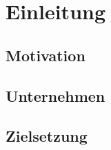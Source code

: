 \section{Einleitung}
\subsection{Motivation}
\subsection{Unternehmen}
\subsection{Zielsetzung}
\newpage

\begin{comment}
- Outline your work such that readers who have not read subsequent chapters get an idea of what
  - your "problem domain" is (e.g. the software quality department of some company or the overarching research project you are working in)
  - the situation is (e.g. software tests at some company are done in complete manual fash-ion)
  - the complication / problem is (e.g. hotfixes have to be deployed totally untested in pro-duction)
  - what your approach is (e.g. establishing a concept and tool evaluation for continuously improving code coverage of automated tests)
  - what beyond the scope of your thesis is (e.g. also implementing a CICD pipeline)
  - what the actual core results are (e.g. how many tools have been evaluated)

From that it must clear, what your thesis'contribution actually is. Please delineate your contribution from every concept, method, tool, framework or whatever implementation your thesis took for granted and is built upon.

This chapter deliberately anticipates contents of the latter chapters but please refrain from spe-cific technical termsof your application domain or solution here. Trade technical accuracy for com-mon comprehensibility here. Write this chapter as a "management summary" and do not spend more than two to three pages here.

Also explain structure of your thesis, i.e., summarize the contents of each chapter in one sentence or paragraph and describe the overarching storyline, i.e., how chapters build upon each other.
\end{comment}
